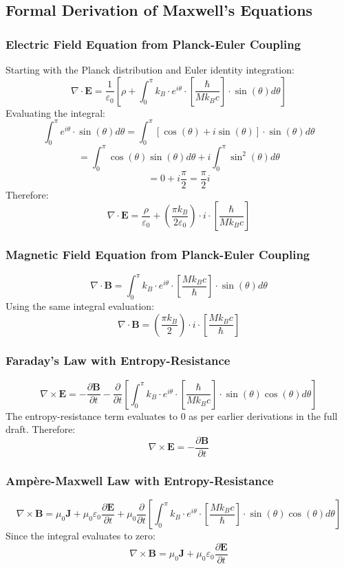 ﻿\documentclass[12pt]{article}
\begin{document}
\subsection{Formal Derivation of Maxwell's Equations}

\subsubsection{Electric Field Equation from Planck-Euler Coupling}
Starting with the Planck distribution and Euler identity integration:
$$\nabla\cdot\mathbf{E} = \frac{1}{\varepsilon_0}\left[\rho + \int_0^\pi k_B\cdot e^{i\theta}\cdot\left[\frac{\hbar}{Mk_Bc}\right]\cdot\sin(\theta)d\theta\right]$$
Evaluating the integral:
$$\int_0^\pi e^{i\theta}\cdot\sin(\theta)d\theta = \int_0^\pi [\cos(\theta) + i\sin(\theta)]\cdot\sin(\theta)d\theta$$
$$= \int_0^\pi \cos(\theta)\sin(\theta)d\theta + i\int_0^\pi \sin^2(\theta)d\theta$$
$$= 0 + i\frac{\pi}{2} = \frac{\pi}{2}i$$
Therefore:
$$\nabla\cdot\mathbf{E} = \frac{\rho}{\varepsilon_0} + \left(\frac{\pi k_B}{2\varepsilon_0}\right)\cdot i\cdot\left[\frac{\hbar}{Mk_Bc}\right]$$

\subsubsection{Magnetic Field Equation from Planck-Euler Coupling}
$$\nabla\cdot\mathbf{B} = \int_0^\pi k_B\cdot e^{i\theta}\cdot\left[\frac{Mk_Bc}{\hbar}\right]\cdot\sin(\theta)d\theta$$
Using the same integral evaluation:
$$\nabla\cdot\mathbf{B} = \left(\frac{\pi k_B}{2}\right)\cdot i\cdot\left[\frac{Mk_Bc}{\hbar}\right]$$

\subsubsection{Faraday's Law with Entropy-Resistance}
$$\nabla\times\mathbf{E} = -\frac{\partial\mathbf{B}}{\partial t} - \frac{\partial}{\partial t}\left[\int_0^\pi k_B\cdot e^{i\theta}\cdot\left[\frac{\hbar}{Mk_Bc}\right]\cdot\sin(\theta)\cos(\theta)d\theta\right]$$
The entropy-resistance term evaluates to $0$ as per earlier derivations in the full draft.
Therefore:
$$\nabla\times\mathbf{E} = -\frac{\partial\mathbf{B}}{\partial t}$$

\subsubsection{Ampère-Maxwell Law with Entropy-Resistance}
$$\nabla\times\mathbf{B} = \mu_0\mathbf{J} + \mu_0\varepsilon_0\frac{\partial\mathbf{E}}{\partial t} + \mu_0\frac{\partial}{\partial t}\left[\int_0^\pi k_B\cdot e^{i\theta}\cdot\left[\frac{Mk_Bc}{\hbar}\right]\cdot\sin(\theta)\cos(\theta)d\theta\right]$$
Since the integral evaluates to zero:
$$\nabla\times\mathbf{B} = \mu_0\mathbf{J} + \mu_0\varepsilon_0\frac{\partial\mathbf{E}}{\partial t}$$
\end{document}
